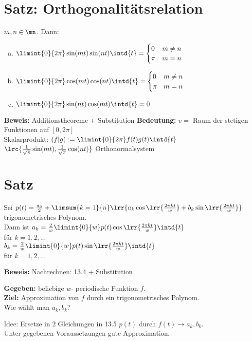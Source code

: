 \section{Satz: Orthogonalitätsrelation}
	$ m,n\in\mn $. Dann:
	\begin{enumerate}[a)]
	\item $ \limint{0}{2\pi}\sin(mt)\sin(nt)\intd{t}=\begin{cases}0&m\neq n\\\pi&m=n\end{cases} $
	\item $ \limint{0}{2\pi}\cos(mt)\cos(nt)\intd{t}=\begin{cases}0&m\neq n\\\pi&m=n\end{cases} $
	\item  $ \limint{0}{2\pi}\sin(nt)\cos(mt)\intd{t}=0 $
	\end{enumerate}
	\textbf{Beweis:} Additionstheoreme + Substitution
	\textbf{Bedeutung:} $ v= $ Raum der stetigen Funktionen auf $ [0,2\pi] $\\
	Skalarprodukt: $ (f|g):=\limint{0}{2\pi}f(t)g(t)\intd{t} $\\
	$ \lrc{\frac{1}{\sqrt{\pi}}\sin(mt),\frac{1}{\sqrt{\pi}}\cos(nt)} $ Orthonormalsystem
	
\section{Satz}
	Sei $ p(t)=\frac{a_0}{2}+\limsum{k=1}{n}\lrr{a_k\cos\lrr{\frac{2\pi kt}{w}}+b_k\sin\lrr{\frac{2\pi kt}{w}}} $ trigonometrisches Polynom.\\
	Dann ist $ a_k=\frac{2}{w}\limint{0}{w}p(t)\cos\lrr{\frac{2\pi kt}{w}}\intd{t} $\\
	für $ k=1,2,... $\\
	$ b_k=\frac{2}{w}\limint{0}{w}p(t)\sin\lrr{\frac{2\pi kt}{w}}\intd{t} $\\
	für $ k=1,2,... $
	
	\textbf{Beweis:} Nachrechnen: 13.4 + Substitution
	
	\textbf{Gegeben:} beliebige $ w $- periodische Funktion $ f $.\\
	\textbf{Ziel:} Approximation von $ f $ durch ein trigonometrisches Polynom.\\
	Wie wählt man $ a_k,b_k $?
	
	Idee: Ersetze in 2 Gleichungen in 13.5 $ p(t) $ durch $ f(t)\rightarrow a_k,b_k $.\\
	Unter gegebenen Voraussetzungen gute Approximation.
	

